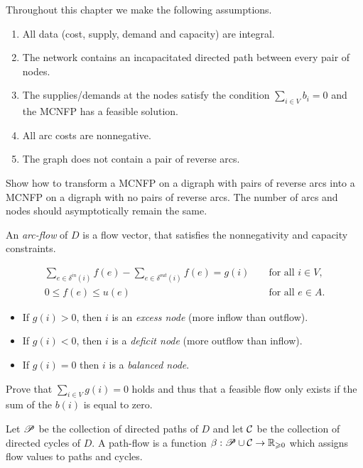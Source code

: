  
  Throughout this chapter we make the following assumptions.
  
  \begin{enumerate}
  \item All data (cost, supply, demand and capacity) are integral.
  \item The network contains an incapacitated directed path between
    every pair of nodes. 
  \item The supplies/demands at the nodes satisfy the condition 
    $\sum_{i \in V} b_i=0$ and the MCNFP has a feasible solution. 
  \item All arc costs are nonnegative. 
  \item The graph does not contain a pair of reverse arcs. 
  \end{enumerate}

\begin{exercise} 
   Show how to transform a MCNFP on a digraph with pairs of 
   reverse arcs into a MCNFP on a digraph with no pairs of 
   reverse arcs.  The number of arcs and nodes should 
   asymptotically remain the same.
\end{exercise}
  
  An \emph{arc-flow} of $D$ is a flow vector, that satisfies the
  nonnegativity and capacity constraints. 
 
  \begin{eqnarray*}
        \sum_{e\in \delta^{in}(i)} f(e) -  \sum_{e \in \delta^{out}(i)} f(e)  =  g(i) & &   \text{ for all } i \in V,\\
        0 \leq f(e) \leq u(e)                 & &   \text{ for all }
        e \in A. 
  \end{eqnarray*}


  \begin{itemize}
  \item  If $g(i) >0$, then $i$ is an \emph{excess node} (more inflow than
    outflow).
  \item  If $g(i) <0$, then $i$ is a \emph{deficit node} (more outflow than
    inflow).
  \item  If $g(i) = 0$ then $i$ is a \emph{balanced node}.
  \end{itemize}
  
  
\begin{exercise}
   Prove that $\sum_{i \in V} g(i) = 0$ holds and thus that a 
   feasible flow only exists if the sum of the $b(i)$ is equal 
   to zero. 
\end{exercise}

  
  Let $\mathscr{P}$ be the collection of directed paths  of $D$ and
  let $\mathcal{C}$ be the collection of directed cycles of $D$. A
  path-flow is a function $\beta: \mathscr{P} \cup \mathcal{C} \to \mathbb{R}_{\geqslant0}$ which assigns
  flow values to paths and cycles. 

